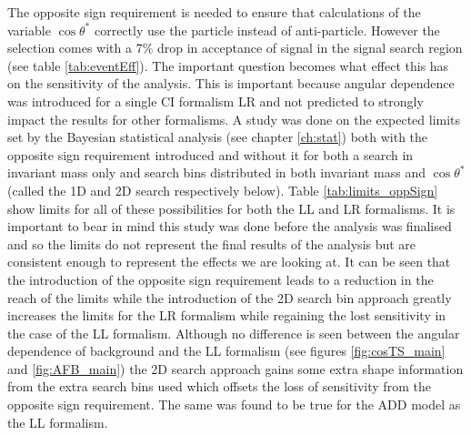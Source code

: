     The opposite sign requirement is needed to ensure that calculations of the variable $\cos{\theta^{*}}$  correctly use the particle instead of anti-particle. However the selection comes with a 7\% drop in acceptance of signal in the signal search region (see table \ref{tab:eventEff}). The important question becomes what effect this has on the sensitivity of the analysis. This is important because angular dependence was introduced for a single CI formalism LR and not predicted to strongly impact the results for other formalisms. 
    A study was done on the expected limits set by the Bayesian statistical analysis (see chapter \ref{ch:stat}) both with the opposite sign requirement introduced and without it for both a search in invariant mass only and search bins distributed in both invariant mass and $\cos{\theta^{*}}$ (called the 1D and 2D search respectively below). Table \ref{tab:limits_oppSign} show limits for all of these possibilities for both the LL and LR formalisms. It is important to bear in mind this study was done before the analysis was finalised and so the limits do not represent the final results of the analysis but are consistent enough to represent the effects we are looking at. It can be seen that the introduction of the opposite sign requirement leads to a reduction in the reach of the limits while the introduction of the 2D search bin approach greatly increases the limits for the LR formalism while regaining the lost sensitivity in the case of the LL formalism. Although no difference is seen between the angular dependence of background and the LL formalism (see figures \ref{fig:cosTS_main} and \ref{fig:AFB_main}) the 2D search approach gains some extra shape information from the extra search bins used which offsets the loss of sensitivity from the opposite sign requirement. The same was found to be true for the ADD model as the LL formalism.  


